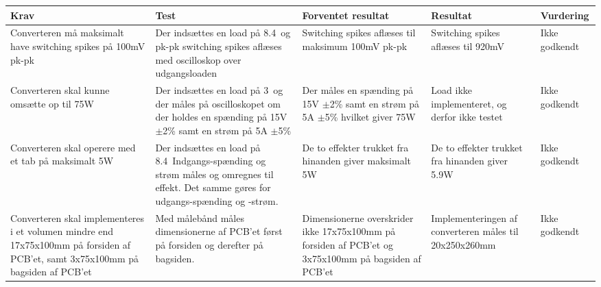 \begin{tabularx}{\textwidth}{|X|X|X|X|X|}
	\hline
	\textbf{Krav} & \textbf{Test} & \textbf{Forventet resultat} & \textbf{Resultat} & \textbf{Vurdering} \\ \hline
	Converteren må maksimalt have switching spikes på 100mV pk-pk & Der indsættes en load på 8.4\ohm\ og pk-pk switching spikes aflæses med oscilloskop over udgangsloaden & Switching spikes aflæses til maksimum 100mV pk-pk & Switching spikes aflæses til 920mV & Ikke godkendt \\ \hline
	Converteren skal kunne omsætte op til 75W & Der indsættes en load på 3\ohm\ og der måles på oscilloskopet om der holdes en spænding på 15V $\pm$2\% samt en strøm på 5A $\pm$5\% & Der måles en spænding på 15V $\pm$2\% samt en strøm på 5A $\pm$5\% hvilket giver 75W & Load ikke implementeret, og derfor ikke testet & Ikke godkendt \\ \hline
	Converteren skal operere med et tab på maksimalt 5W & Der indsættes en load på 8.4\ohm\ Indgangs-spænding og strøm måles og omregnes til effekt. Det samme gøres for udgangs-spænding og -strøm. & De to effekter trukket fra hinanden giver maksimalt 5W & De to effekter trukket fra hinanden giver 5.9W & Ikke godkendt \\ \hline 
	Converteren skal implementeres i et volumen mindre end 17x75x100mm på forsiden af PCB'et, samt 3x75x100mm på bagsiden af PCB'et & Med målebånd måles dimensionerne af PCB'et først på forsiden og derefter på bagsiden. & Dimensionerne overskrider ikke 17x75x100mm på forsiden af PCB'et og 3x75x100mm på bagsiden af PCB'et & Implementeringen af converteren måles til 20x250x260mm & Ikke godkendt \\ \hline
	
\end{tabularx}



